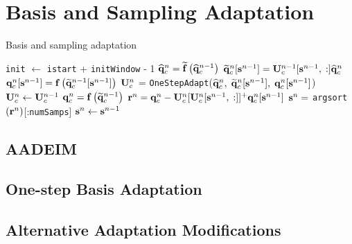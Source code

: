 \section{Basis and Sampling Adaptation}\label{sec:adaptation}

\begin{algorithm}
    \caption{Basis and sampling adaptation}\label{alg:adapt}
    \begin{algorithmic}

    \STATE \texttt{init} $\leftarrow$ \texttt{istart} + \texttt{initWindow} - 1 
        \STATE $\mathbf{\widehat{q}}_{c}^{n} = \mathbf{\widetilde{f}}\left(\mathbf{\widehat{q}}_{c}^{n-1}\right)$
        \STATE $\consVecRom^{\timeIdx}[\sampVec^{\timeIdx-1}] = \consTrial^{\timeIdx-1}[\sampVec^{\timeIdx-1}, \; :] \consVecCoef^{\timeIdx}$
            \STATE $\mathbf{q}_{c}^{n}[\mathbf{s}^{n-1}] = \mathbf{f} \left(\mathbf{\widetilde{q}}_{c}^{n - 1}[\mathbf{s}^{n-1}]\right)$
            \STATE $\consTrial^{\timeIdx}$ = \texttt{OneStepAdapt}($\mathbf{\widehat{q}}_{c}^{n}, \; \mathbf{\widetilde{q}}_{c}^{n}[\mathbf{s}^{n-1}], \; \mathbf{q}_{c}^{n}[\mathbf{s}^{n-1}]$)
        \ELSE
            \STATE $\consTrial^{\timeIdx} \leftarrow \consTrial^{\timeIdx - 1}$
        \ENDIF
            \STATE $\mathbf{q}_{c}^{n} = \mathbf{f} \left(\mathbf{\widetilde{q}}_{c}^{n-1}\right)$
            \STATE $\resVec^{\timeIdx} = \consVec^{\timeIdx} - \consTrial^{\timeIdx} [\consTrial^{\timeIdx}[\sampVec^{\timeIdx-1}, \; :]]^+ \consVec^{\timeIdx}[\sampVec^{\timeIdx - 1}]$
            \STATE $\mathbf{s}^{n} = $ \texttt{argsort}$(\mathbf{r}^{n})$[:\texttt{numSamps}]
        \ELSE
            \STATE $\mathbf{s}^{n} \leftarrow \mathbf{s}^{n-1}$
        \ENDIF
    \ENDFOR

    \end{algorithmic}
\end{algorithm}

\subsection{AADEIM}

\subsection{One-step Basis Adaptation}

\subsection{Alternative Adaptation Modifications}